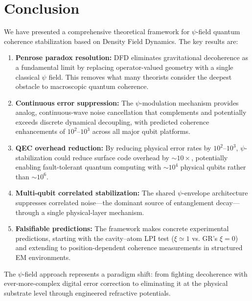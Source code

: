 \documentclass[aps,prd,twocolumn,superscriptaddress,nofootinbib]{revtex4-2}
\begin{document}
\section{Conclusion}\label{sec:conclusion}

We have presented a comprehensive theoretical framework for $\psi$-field
quantum coherence stabilization based on Density Field Dynamics. The
key results are:

\begin{enumerate}
\item \textbf{Penrose paradox resolution:} DFD eliminates gravitational
decoherence as a fundamental limit by replacing operator-valued geometry
with a single classical $\psi$ field. This removes what many theorists
consider the deepest obstacle to macroscopic quantum coherence.

\item \textbf{Continuous error suppression:} The $\psi$-modulation
mechanism provides analog, continuous-wave noise cancellation that
complements and potentially exceeds discrete dynamical decoupling, with
predicted coherence enhancements of $10^2$--$10^3$ across all major
qubit platforms.

\item \textbf{QEC overhead reduction:} By reducing physical error rates
by $10^2$--$10^3$, $\psi$-stabilization could reduce surface code
overhead by $\sim 10\times$, potentially enabling fault-tolerant quantum
computing with $\sim 10^4$ physical qubits rather than $\sim 10^6$.

\item \textbf{Multi-qubit correlated stabilization:} The shared
$\psi$-envelope architecture suppresses correlated noise---the dominant
source of entanglement decay---through a single physical-layer
mechanism.

\item \textbf{Falsifiable predictions:} The framework makes concrete
experimental predictions, starting with the cavity--atom LPI test
($\xi \simeq 1$ vs. GR's $\xi = 0$) and extending to
position-dependent coherence measurements in structured EM environments.
\end{enumerate}

The $\psi$-field approach represents a paradigm shift: from fighting
decoherence with ever-more-complex digital error correction to
eliminating it at the physical substrate level through engineered
refractive potentials.
\end{document}
